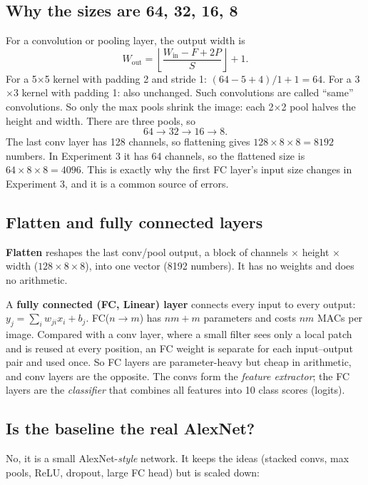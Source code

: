 \documentclass[11pt]{article}
\newcommand{\key}[1]{\textbf{#1}}
\begin{document}
\subsection{Why the sizes are 64, 32, 16, 8}

For a convolution or pooling layer, the output width is
\[
W_{\text{out}} = \left\lfloor\frac{W_{\text{in}} - F + 2P}{S}\right\rfloor + 1 .
\]
For a 5$\times$5 kernel with padding 2 and stride 1: $(64-5+4)/1+1 = 64$. For a 3$\times$3 kernel with padding 1: also unchanged. Such convolutions are called ``same'' convolutions. So only the max pools shrink the image: each 2$\times$2 pool halves the height and width. There are three pools, so
\[
64 \to 32 \to 16 \to 8 .
\]
The last conv layer has 128 channels, so flattening gives $128\times 8\times 8 = 8192$ numbers. In Experiment 3 it has 64 channels, so the flattened size is $64\times 8\times 8 = 4096$. This is exactly why the first FC layer's input size changes in Experiment 3, and it is a common source of errors.

\subsection{Flatten and fully connected layers}

\key{Flatten} reshapes the last conv/pool output, a block of channels $\times$ height $\times$ width ($128\times 8\times 8$), into one vector (8192 numbers). It has no weights and does no arithmetic.

A \key{fully connected (FC, Linear) layer} connects every input to every output: $y_j=\sum_i w_{ji}x_i+b_j$. FC($n\to m$) has $nm+m$ parameters and costs $nm$ MACs per image. Compared with a conv layer, where a small filter sees only a local patch and is reused at every position, an FC weight is separate for each input--output pair and used once. So FC layers are parameter-heavy but cheap in arithmetic, and conv layers are the opposite. The convs form the \emph{feature extractor}; the FC layers are the \emph{classifier} that combines all features into 10 class scores (logits).

\subsection{Is the baseline the real AlexNet?}

No, it is a small AlexNet-\emph{style} network. It keeps the ideas (stacked convs, max pools, ReLU, dropout, large FC head) but is scaled down:
\end{document}
